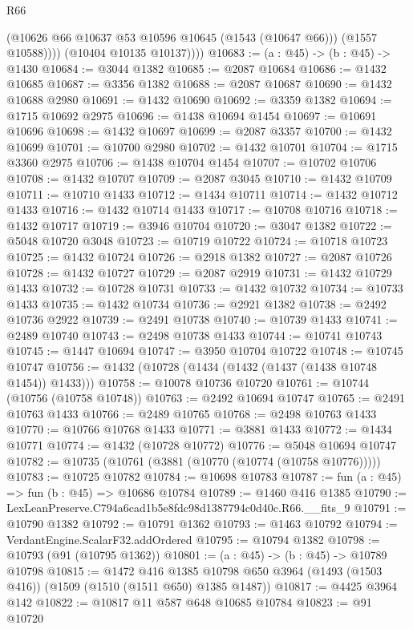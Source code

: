 \begin{lexlean}{R66}
\begin{coremodule}
                (@10626 @66 @10637 @53 @10596 @10645 (@1543 (@10647 @66)))
                (@1557 @10588))))
          (@10404 @10135 @10137))))
@10683 := (a : @45) -> (b : @45) -> @1430
@10684 := @3044 @1382
@10685 := @2087 @10684
@10686 := @1432 @10685
@10687 := @3356 @1382
@10688 := @2087 @10687
@10690 := @1432 @10688 @2980
@10691 := @1432 @10690
@10692 := @3359 @1382
@10694 := @1715 @10692 @2975
@10696 := @1438 @10694 @1454
@10697 := @10691 @10696
@10698 := @1432 @10697
@10699 := @2087 @3357
@10700 := @1432 @10699
@10701 := @10700 @2980
@10702 := @1432 @10701
@10704 := @1715 @3360 @2975
@10706 := @1438 @10704 @1454
@10707 := @10702 @10706
@10708 := @1432 @10707
@10709 := @2087 @3045
@10710 := @1432 @10709
@10711 := @10710 @1433
@10712 := @1434 @10711
@10714 := @1432 @10712 @1433
@10716 := @1432 @10714 @1433
@10717 := @10708 @10716
@10718 := @1432 @10717
@10719 := @3946 @10704
@10720 := @3047 @1382
@10722 := @5048 @10720 @3048
@10723 := @10719 @10722
@10724 := @10718 @10723
@10725 := @1432 @10724
@10726 := @2918 @1382
@10727 := @2087 @10726
@10728 := @1432 @10727
@10729 := @2087 @2919
@10731 := @1432 @10729 @1433
@10732 := @10728 @10731
@10733 := @1432 @10732
@10734 := @10733 @1433
@10735 := @1432 @10734
@10736 := @2921 @1382
@10738 := @2492 @10736 @2922
@10739 := @2491 @10738
@10740 := @10739 @1433
@10741 := @2489 @10740
@10743 := @2498 @10738 @1433
@10744 := @10741 @10743
@10745 := @1447 @10694
@10747 := @3950 @10704 @10722
@10748 := @10745 @10747
@10756 := @1432 (@10728 (@1434 (@1432 (@1437 (@1438 @10748 @1454)) @1433)))
@10758 := @10078 @10736 @10720
@10761 := @10744 (@10756 (@10758 @10748))
@10763 := @2492 @10694 @10747
@10765 := @2491 @10763 @1433
@10766 := @2489 @10765
@10768 := @2498 @10763 @1433
@10770 := @10766 @10768 @1433
@10771 := @3881 @1433
@10772 := @1434 @10771
@10774 := @1432 (@10728 @10772)
@10776 := @5048 @10694 @10747
@10782 := @10735 (@10761 (@3881 (@10770 (@10774 (@10758 @10776)))))
@10783 := @10725 @10782
@10784 := @10698 @10783
@10787 := fun (a : @45) => fun (b : @45) => @10686 @10784
@10789 := @1460 @416 @1385
@10790 := LexLeanPreserve.C794a6cad1b5e8fdc98d1387794c0d40c.R66.__fits_9
@10791 := @10790 @1382
@10792 := @10791 @1362
@10793 := @1463 @10792
@10794 := VerdantEngine.ScalarF32.addOrdered
@10795 := @10794 @1382
@10798 := @10793 (@91 (@10795 @1362))
@10801 := (a : @45) -> (b : @45) -> @10789 @10798
@10815 := @1472
    @416
    @1385
    @10798
    @650
    @3964
    (@1493 (@1503 @416))
    (@1509 (@1510 (@1511 @650) @1385 @1487))
@10817 := @4425 @3964 @142
@10822 := @10817 @11 @587 @648 @10685 @10784
@10823 := @91 @10720

\end{coremodule}
\end{lexlean}

